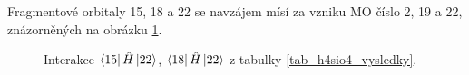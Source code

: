 \documentclass[
  digital, %
  table,   %
  lof,     %
  lot,     %
]{fithesis3}
\begin{document}
Fragmentové orbitaly  15, 18 a 22 se navzájem mísí za vzniku MO číslo 2, 19 a 22, znázorněných na obrázku \ref{obr_h4sio4_vysledky_III}.   
\begin{figure}
\begin{center}
\caption{Interakce $\bra{15}{\hat{H}}\ket{22}$, $\bra{18}{\hat{H}}\ket{22}$ z tabulky \ref{tab_h4sio4_vysledky}.}
\label{obr_h4sio4_vysledky_III}
\end{center}
\end{figure} 
\end{document}
